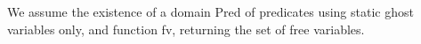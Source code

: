 
We assume the existence of a domain \textsf{Pred} of predicates using
static ghost variables only, and function
\textsf{fv}, returning the set of free variables.

